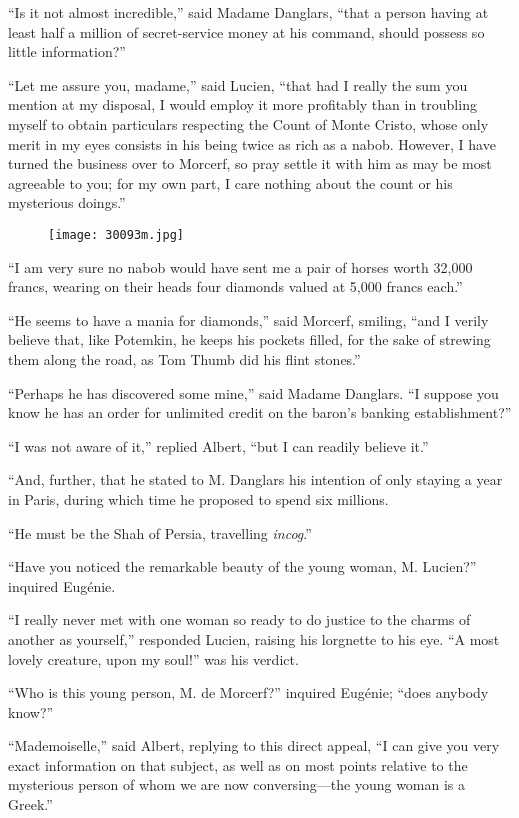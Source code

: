 “Is it not almost incredible,” said Madame Danglars, “that a person
having at least half a million of secret-service money at his command,
should possess so little information?”

“Let me assure you, madame,” said Lucien, “that had I really the sum
you mention at my disposal, I would employ it more profitably than in
troubling myself to obtain particulars respecting the Count of Monte
Cristo, whose only merit in my eyes consists in his being twice as rich
as a nabob. However, I have turned the business over to Morcerf, so
pray settle it with him as may be most agreeable to you; for my own
part, I care nothing about the count or his mysterious doings.”

\begin{figure}[ht]
\texttt{[image: 30093m.jpg]}
\end{figure}

“I am very sure no nabob would have sent me a pair of horses worth
32,000 francs, wearing on their heads four diamonds valued at 5,000
francs each.”

“He seems to have a mania for diamonds,” said Morcerf, smiling, “and I
verily believe that, like Potemkin, he keeps his pockets filled, for
the sake of strewing them along the road, as Tom Thumb did his flint
stones.”

“Perhaps he has discovered some mine,” said Madame Danglars. “I suppose
you know he has an order for unlimited credit on the baron’s banking
establishment?”

“I was not aware of it,” replied Albert, “but I can readily believe
it.”

“And, further, that he stated to M. Danglars his intention of only
staying a year in Paris, during which time he proposed to spend six
millions.

“He must be the Shah of Persia, travelling \textit{incog}.”

“Have you noticed the remarkable beauty of the young woman, M. Lucien?”
inquired Eugénie.

“I really never met with one woman so ready to do justice to the charms
of another as yourself,” responded Lucien, raising his lorgnette to his
eye. “A most lovely creature, upon my soul!” was his verdict.

“Who is this young person, M. de Morcerf?” inquired Eugénie; “does
anybody know?”

“Mademoiselle,” said Albert, replying to this direct appeal, “I can
give you very exact information on that subject, as well as on most
points relative to the mysterious person of whom we are now
conversing—the young woman is a Greek.”

